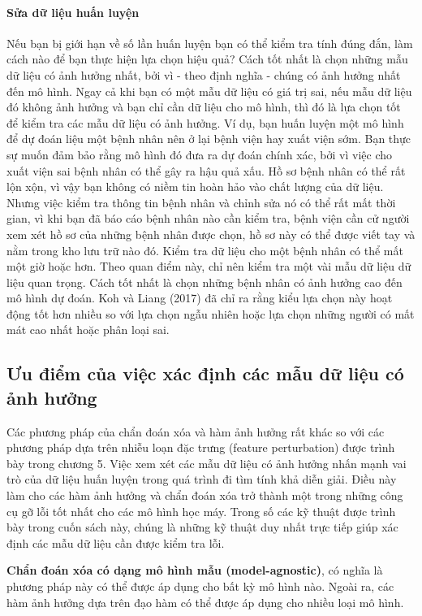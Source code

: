 \paragraph{Sửa dữ liệu huấn luyện}

Nếu bạn bị giới hạn về số lần huấn luyện bạn có thể kiểm tra tính đúng đắn, làm cách nào để bạn thực hiện lựa chọn hiệu quả? Cách tốt nhất là chọn những mẫu dữ liệu có ảnh hưởng nhất, bởi vì - theo định nghĩa - chúng có ảnh hưởng nhất đến mô hình. Ngay cả khi bạn có một mẫu dữ liệu có giá trị sai, nếu mẫu dữ liệu đó không ảnh hưởng và bạn chỉ cần dữ liệu cho mô hình, thì đó là lựa chọn tốt để kiểm tra các mẫu dữ liệu có ảnh hưởng. Ví dụ, bạn huấn luyện một mô hình để dự đoán liệu một bệnh nhân nên ở lại bệnh viện hay xuất viện sớm. Bạn thực sự muốn đảm bảo rằng mô hình đó đưa ra dự đoán chính xác, bởi vì việc cho xuất viện sai bệnh nhân có thể gây ra hậu quả xấu. Hồ sơ bệnh nhân có thể rất lộn xộn, vì vậy bạn không có niềm tin hoàn hảo vào chất lượng của dữ liệu. Nhưng việc kiểm tra thông tin bệnh nhân và chỉnh sửa nó có thể rất mất thời gian, vì khi bạn đã báo cáo bệnh nhân nào cần kiểm tra, bệnh viện cần cử người xem xét hồ sơ của những bệnh nhân được chọn, hồ sơ này có thể được viết tay và nằm trong kho lưu trữ nào đó. Kiểm tra dữ liệu cho một bệnh nhân có thể mất một giờ hoặc hơn. Theo quan điểm này, chỉ nên kiểm tra một vài mẫu dữ liệu dữ liệu quan trọng. Cách tốt nhất là chọn những bệnh nhân có ảnh hưởng cao đến mô hình dự đoán. Koh và Liang (2017) đã chỉ ra rằng kiểu lựa chọn này hoạt động tốt hơn nhiều so với lựa chọn ngẫu nhiên hoặc lựa chọn những người có mất mát cao nhất hoặc phân loại sai.

\subsection{Ưu điểm của việc xác định các mẫu dữ liệu có ảnh hưởng}

Các phương pháp của chẩn đoán xóa và hàm ảnh hưởng rất khác so với các phương pháp dựa trên nhiễu loạn đặc trưng (feature perturbation) được trình bày trong chương 5. Việc xem xét các mẫu dữ liệu có ảnh hưởng nhấn mạnh vai trò của dữ liệu huấn luyện trong quá trình đi tìm tính khả diễn giải. Điều này làm cho các hàm ảnh hưởng và chẩn đoán xóa trở thành một trong những công cụ gỡ lỗi tốt nhất cho các mô hình học máy. Trong số các kỹ thuật được trình bày trong cuốn sách này, chúng là những kỹ thuật duy nhất trực tiếp giúp xác định các mẫu dữ liệu cần được kiểm tra lỗi.

\textbf{Chẩn đoán xóa có dạng mô hình mẫu (model-agnostic)}, có nghĩa là phương pháp này có thể được áp dụng cho bất kỳ mô hình nào. Ngoài ra, các hàm ảnh hưởng dựa trên đạo hàm có thể được áp dụng cho nhiều loại mô hình.

